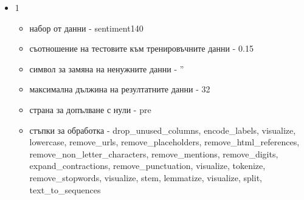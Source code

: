 \documentclass{article}
\begin{document}
\begin{itemize}
  \item 1

  \begin{itemize}
    \item набор от данни - sentiment140
    \item съотношение на тестовите към тренировъчните данни - 0.15
    \item символ за замяна на ненужните данни - ''
    \item максимална дължина на резултатните данни - 32
    \item страна за допълване с нули - pre
    \item стъпки за обработка - drop\_unused\_columns, encode\_labels, visualize, lowercase, remove\_urls,
    remove\_placeholders, remove\_html\_references, remove\_non\_letter\_characters, remove\_mentions,
    remove\_digits, expand\_contractions, remove\_punctuation, visualize, tokenize, remove\_stopwords, visualize,
    stem, lemmatize, visualize, split, text\_to\_sequences
  \end{itemize}


\end{itemize}
\end{document}
